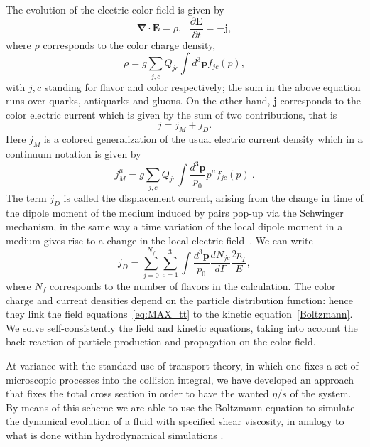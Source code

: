 \documentclass[aps,prc,a4paper,nofootinbib,
preprintnumbers,superscriptaddress,twocolumn,showpacs,showkeys]{revtex4}
\begin{document}
The evolution of the electric color field is given by
\begin{equation}
\bm\nabla\cdot\bm E  = \rho,~~~
\frac{\partial \bm E}{\partial t} = -\bm j,
\label{eq:MAX_tt}
\end{equation}
where $\rho$ corresponds to the color charge density,
\begin{equation}
\rho = g\sum_{j,c}Q_{jc}\int d^3\bm p  f_{jc}(p),
\end{equation}
with $j,c$ standing for flavor and color respectively; the sum in the above equation runs over quarks, antiquarks and gluons.
On the other hand, $\bm j$ corresponds to the color electric current
which is given by the sum of two contributions, that is
\begin{equation}
j = j_M + j_D.
\end{equation}
Here $j_M$ is a colored generalization of the usual electric current density
which in a continuum notation is given by
\begin{equation}
j_M^\mu = g\sum_{j,c}Q_{jc}\int\frac{d^3\bm p}{p_0}p^\mu f_{jc}(p)~.
\end{equation}
The term $j_D$ is called the displacement current, arising from the 
change in time of the dipole moment of the medium induced
by pairs pop-up via the Schwinger mechanism,
in the same way a time variation of the local dipole moment in a medium gives rise
to a change in the local electric field~\cite{MAxwell}.
We can write~\cite{Ryblewski:2013eja}
\begin{equation}
j_D =\sum_{j=0}^{N_f}\sum_{c=1}^3
\int\frac{d^3\bm p}{p_0}
 \frac{dN_{jc}}{d\Gamma} 
\frac{2p_T}{E},
\label{eq:jD}
\end{equation}
where $N_f$ corresponds to the number of flavors in the calculation.
The color charge and current densities depend on the particle distribution
function: hence they link the field equations~\eqref{eq:MAX_tt} to the kinetic 
equation~\eqref{Boltzmann}. 
We solve self-consistently the field and kinetic equations,
taking into account the back reaction of particle production and propagation
on the color field.


At variance with the standard use of transport theory, in which one fixes a set of microscopic processes into the collision integral, we have developed an approach that
fixes the total cross section in order to have the wanted $\eta/s$ of the system. 
By means of this scheme we are able to use the Boltzmann equation to simulate the dynamical evolution of a fluid with specified shear viscosity, in analogy to what is done within hydrodynamical 
simulations \cite{Denicol:2014tha,Huovinen:2008te,El:2009vj}.
\end{document}

